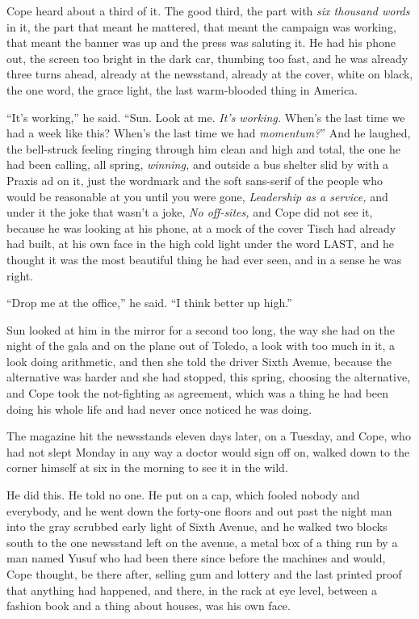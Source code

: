 \documentclass[11pt,openany]{book}
\newcommand{\scenebreak}{\par\vspace{0.5\baselineskip}\begin{center}\textasteriskcentered\quad\textasteriskcentered\quad\textasteriskcentered\end{center}\vspace{0.5\baselineskip}\par}
\begin{document}
Cope heard about a third of it. The good third, the part with \textit{six thousand words} in it, the part that meant he mattered, that meant the campaign was working, that meant the banner was up and the press was saluting it. He had his phone out, the screen too bright in the dark car, thumbing too fast, and he was already three turns ahead, already at the newsstand, already at the cover, white on black, the one word, the grace light, the last warm-blooded thing in America.

``It's working,'' he said. ``Sun. Look at me. \textit{It's working.} When's the last time we had a week like this? When's the last time we had \textit{momentum?}'' And he laughed, the bell-struck feeling ringing through him clean and high and total, the one he had been calling, all spring, \textit{winning,} and outside a bus shelter slid by with a Praxis ad on it, just the wordmark and the soft sans-serif of the people who would be reasonable at you until you were gone, \textit{Leadership as a service,} and under it the joke that wasn't a joke, \textit{No off-sites,} and Cope did not see it, because he was looking at his phone, at a mock of the cover Tisch had already had built, at his own face in the high cold light under the word LAST, and he thought it was the most beautiful thing he had ever seen, and in a sense he was right.

``Drop me at the office,'' he said. ``I think better up high.''

Sun looked at him in the mirror for a second too long, the way she had on the night of the gala and on the plane out of Toledo, a look with too much in it, a look doing arithmetic, and then she told the driver Sixth Avenue, because the alternative was harder and she had stopped, this spring, choosing the alternative, and Cope took the not-fighting as agreement, which was a thing he had been doing his whole life and had never once noticed he was doing.


\scenebreak


The magazine hit the newsstands eleven days later, on a Tuesday, and Cope, who had not slept Monday in any way a doctor would sign off on, walked down to the corner himself at six in the morning to see it in the wild.

He did this. He told no one. He put on a cap, which fooled nobody and everybody, and he went down the forty-one floors and out past the night man into the gray scrubbed early light of Sixth Avenue, and he walked two blocks south to the one newsstand left on the avenue, a metal box of a thing run by a man named Yusuf who had been there since before the machines and would, Cope thought, be there after, selling gum and lottery and the last printed proof that anything had happened, and there, in the rack at eye level, between a fashion book and a thing about houses, was his own face.
\end{document}
